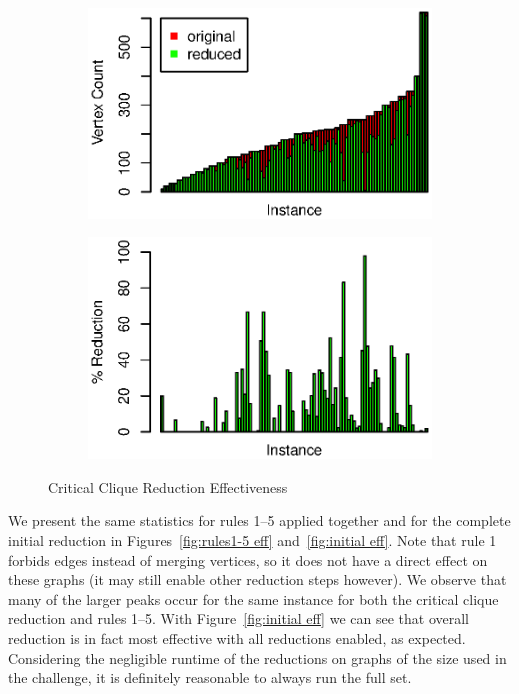\documentclass[12pt,oneside,english,parskip=full,headings=small]{scrbook}
\theoremstyle{definition}
\begin{document}
\begin{figure}[h]
	\begin{subfigure}{0.49\textwidth}
		\includegraphics[width=1.0\linewidth]{crit_cliques_absolute}
	\end{subfigure}
	\begin{subfigure}{0.49\textwidth}
		\includegraphics[width=1.0\linewidth]{crit_cliques_percent}
	\end{subfigure}
	\caption{Critical Clique Reduction Effectiveness}
	\label{fig:crit_clique eff}
\end{figure}

We present the same statistics for rules 1--5 applied together and for the complete initial
reduction in Figures~\ref{fig:rules1-5 eff} and~\ref{fig:initial eff}. Note that rule 1 forbids
edges instead of merging vertices, so it does not have a direct effect on these graphs (it may still
enable other reduction steps however). We observe that many of the larger peaks occur for the same
instance for both the critical clique reduction and rules 1--5. With Figure~\ref{fig:initial eff} we
can see that overall reduction is in fact most effective with all reductions enabled, as expected.
Considering the negligible runtime of the reductions on graphs of the size used in the challenge, it
is definitely reasonable to always run the full set.
\end{document}

